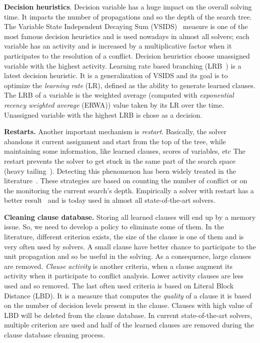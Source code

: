 \textbf{Decision heuristics}. Decision variable has a huge impact on the 
overall solving time. It impacts the number of propagations and so 
the depth of the search tree.
The Variable State Independent Decaying Sum (VSIDS)~\cite{moskewicz2001chaff} measure is one of the most famous decision heuristics and is used
nowadays in almost all solvers; each variable has an activity and  is increased by a multiplicative factor 
when it participates to the resolution of a conflict.
Decision heuristics choose unassigned variable with the highest activity.
Learning rate based branching (LRB~\cite{liang2016learning}) is a latest decision heuristic. It is a
generalization of VSIDS and its goal is to optimize the \emph{learning rate} (LR), defined as the ability to generate
learned clauses. The LRB of a variable is the weighted average (computed with \emph{exponential recency
weighted average} (ERWA))  value taken by its LR over the time. Unassigned variable with the highest LRB is chose as a decision. 


\textbf{Restarts.}
Another important mechanism is \emph{restart}. Basically, the solver abandons it current assignment and 
start from the top of the tree, while maintaining some information, like learned clauses, scores of variables, etc The restart prevents the solver to get stuck in the same part of the search space (heavy tailing~\cite{gomes1997heavy}).
Detecting this phenomenon has been widely treated in the literature~\cite{audemard2012refining,biere2008adaptive}.
These strategies are based on counting the number of conflict or on the monitoring the current search's depth.
Empirically a solver with restart has a better result~\cite{huang2007effect} and is today
used in almost all state-of-the-art solvers.


\textbf{Cleaning clause database.}
Storing  all learned clauses will end up by a memory issue. So, we need to develop a policy to eliminate
some of them. In the literature, different criterion exists,
 the size of the clause is one of them and is very often used by solvers. 
 A small clause have better chance to participate to the unit propagation and so be useful in the solving.
 As a consequence, large clauses are removed.
\emph{Clause activity} is another criteria, when a clause augment its activity when it participate to conflict analysis. Lower activity clauses are less used and so removed.
 The last often used criteria is based on Literal Block Distance (LBD). It is a measure that computes the \emph{quality} of a clause it is based on the number of decision levels present in the clause. Clauses with high value of LBD will be deleted from the clause database.
In current state-of-the-art solvers, multiple criterion are used and half of the learned clauses are removed during the clause database cleaning process.

